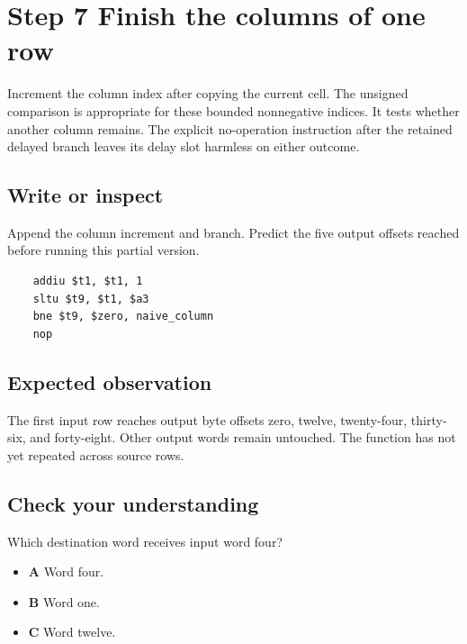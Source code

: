 \section{Step 7 Finish the columns of one row}\label{transpose-s07}

Increment the column index after copying the current cell. The unsigned comparison is appropriate for these bounded nonnegative indices. It tests whether another column remains. The explicit no-operation instruction after the retained delayed branch leaves its delay slot harmless on either outcome.

\subsection{Write or inspect}
Append the column increment and branch. Predict the five output offsets reached before running this partial version.

\begin{verbatim}
    addiu $t1, $t1, 1
    sltu $t9, $t1, $a3
    bne $t9, $zero, naive_column
    nop
\end{verbatim}

\subsection{Expected observation}
The first input row reaches output byte offsets zero, twelve, twenty-four, thirty-six, and forty-eight. Other output words remain untouched. The function has not yet repeated across source rows.

\subsection{Check your understanding}
Which destination word receives input word four?

\begin{itemize}
  \item \textbf{A} Word four.
  \item \textbf{B} Word one.
  \item \textbf{C} Word twelve.
\end{itemize}
